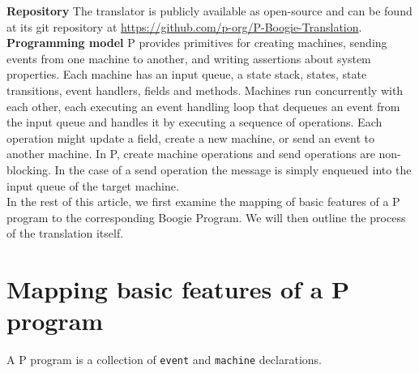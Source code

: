 \documentclass{llncs}
\newcommand{\newparagraph}[1]{\smallskip\noindent\textbf{#1 }}
\begin{document}
\newparagraph{Repository} The translator is publicly available as open-source and can be found at its git repository at \textcolor{blue}{\url{https://github.com/p-org/P-Boogie-Translation}}.\\

\newparagraph{Programming model} P provides primitives for creating machines, sending events from one machine to another, and writing assertions about system properties. Each machine has an input queue, a state stack, states, state transitions, event handlers, fields and methods. Machines run concurrently with each other, each executing an event handling loop that dequeues an event from the input queue and handles it by executing a sequence of operations. Each operation might update a field, create a new machine, or send an event to another machine. In P, create machine operations and send operations are non-blocking. In the case of a send operation the message is simply enqueued into the input queue of the target machine.\\ %

\noindent
In the rest of this article, we first examine the mapping of basic features of a P program to the corresponding Boogie Program. We will then outline the process of the translation itself.

\pagebreak

\section{Mapping basic features of a P program}
\label{sec:basics}

A P program is a collection of \texttt{event} and \texttt{machine} declarations.
\end{document}
